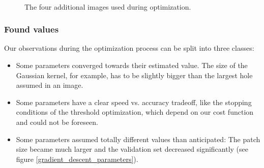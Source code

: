 \documentclass[10pt,conference,compsocconf]{IEEEtran}
\begin{document}
\begin{figure}
  \centering
  ~
  ~
  ~
  ~
  \caption{The four additional images used during optimization.}
  \label{new_images}
\end{figure}

\subsubsection{Found values}
Our observations during the optimization process can be split into three classes:
\begin{itemize}
\item Some parameters converged towards their estimated value. The size of the Gaussian kernel, for example, has to be slightly bigger than the largest hole assumed in an image.
\item Some parameters have a clear speed vs. accuracy tradeoff, like the stopping conditions of the threshold optimization, which depend on our cost function and could not be foreseen.
\item Some parameters assumed totally different values than anticipated: The patch size became much larger and the validation set decreased significantly (see figure \ref{gradient_descent_parameters}).
\end{itemize}
\end{document}
